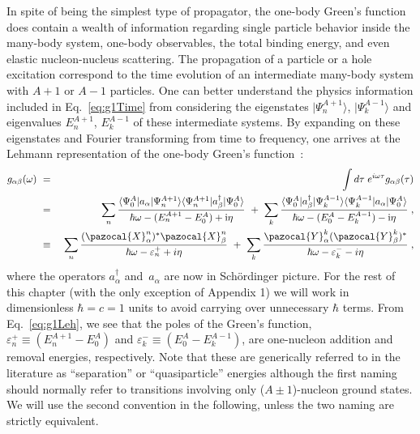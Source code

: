 In spite of being the simplest type of propagator, the one-body Green's function does contain a wealth of information regarding single particle behavior inside the many-body system, one-body observables, the total binding energy, and even elastic nucleon-nucleus scattering.
%
The propagation of a particle or a hole excitation correspond to the time evolution of an intermediate many-body system with $A+1$ or $A-1$ particles.
One can better  understand the physics information included in Eq.~\eqref{eq:g1Time} from considering the eigenstates $\vert\Psi^{A+1}_n\rangle$, $\vert\Psi^{A-1}_k\rangle$ and eigenvalues $E^{A+1}_n$, $E^{A-1}_k$ of these intermediate systems. By expanding on these eigenstates and Fourier transforming from time to frequency, one arrives at the Lehmann representation of the one-body Green's function~\cite{ch11_Lehmann1954}:
\begin{eqnarray}
 g_{\alpha\beta}(\omega) ~&=&~ \int d\tau \; e^{i\omega\tau} g_{\alpha\beta}(\tau)
 \nonumber \\
 &=&~
 \sum_n  \frac{ 
          \langle\Psi^A_0\vert  	a_\alpha   \vert\Psi^{A+1}_n\rangle
          \langle\Psi^{A+1}_n\vert  a^\dagger_\beta  \vert\Psi^A_0\rangle
              }{\hbar\omega - (E^{A+1}_n - E^A_0) + {\rm i} \eta }
 ~+~ \sum_k \frac{
 		  \langle\Psi^A_0\vert  	a^\dagger_\beta   \vert\Psi^{A-1}_k\rangle
          \langle\Psi^{A-1}_k\vert  a_\alpha  \vert\Psi^A_0\rangle
              }{\hbar\omega - (E^A_0 - E^{A-1}_k) - {\rm i} \eta } \; ,
 \nonumber \\
  &\equiv&~ \sum_n \frac{(\pazocal{X}^{n}_\alpha)^*  \pazocal{X}^{n}_\beta}{\hbar\omega  - \varepsilon^+_{n} + i\eta} 
        ~+~ \sum_k \frac{\pazocal{Y}^{k}_\alpha  (\pazocal{Y}^{k}_\beta)^*}{\hbar\omega  - \varepsilon^-_{k} - i\eta}  \; ,
\label{eq:g1Leh}
\end{eqnarray}
where the operators $a^\dagger_\alpha$ and~$a_\alpha$ are now in Sch\"ordinger picture.
%
For the rest of this chapter (with the only exception of Appendix 1) we will work in dimensionless $\hbar=c=1$ units to avoid carrying over unnecessary  $\hbar$ terms.
%
From Eq.~\eqref{eq:g1Leh}, we see that the poles of the Green's function,
\hbox{$\varepsilon_n^{+}\equiv(E^{A+1}_n - E^A_0)$} and  \hbox{$\varepsilon_k^{-}\equiv(E^A_0 - E^{A-1}_k)$},
are one-nucleon addition and removal energies, respectively.  Note that these are generically referred to in the literature as ``separation'' or ``quasiparticle'' energies although the first naming should normally refer to transitions involving only ($A\pm1$)-nucleon ground states.  We will use the second convention in the following, unless the two naming are strictly equivalent.
